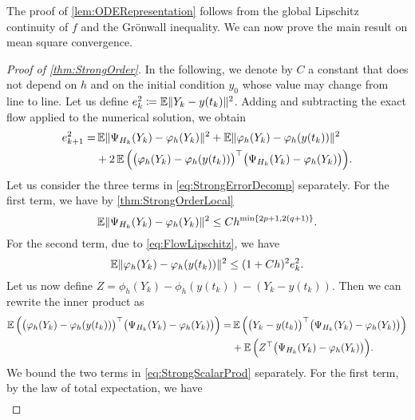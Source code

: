 \documentclass[10pt]{article}
\begin{document}
The proof of \cref{lem:ODERepresentation} follows from the global Lipschitz continuity of $f$ and the Grönwall inequality. We can now prove the main result on mean square convergence.
\begin{proof}[Proof of \cref{thm:StrongOrder}] In the following, we denote by $C$ a constant that does not depend on $h$ and on the initial condition $y_0$ whose value may change from line to line. Let us define $e_k^2 \coloneqq \operatorname{\mathbb{E}}\lVert Y_k - y(t_k)\rVert^2$. Adding and subtracting the exact flow applied to the numerical solution, we obtain
	\begin{equation}\label{eq:StrongErrorDecomp}
		\begin{aligned}
			e_{k+1}^2 = &\operatorname{\mathbb{E}}\lVert\Psi_{H_k}(Y_k) - \varphi_{h}(Y_k)\rVert^2 + \operatorname{\mathbb{E}}\lVert\varphi_{h}(Y_k) - \varphi_{h}(y(t_k))\rVert^2 \\
					  &+ 2\operatorname{\mathbb{E}}\Big(\big(\varphi_{h}(Y_k) - \varphi_{h}(y(t_k))\big)^\top \big(\Psi_{H_k}(Y_k) - \varphi_{h}(Y_k)\big)\Big).
		\end{aligned}
	\end{equation}
	Let us consider the three terms in \eqref{eq:StrongErrorDecomp} separately. For the first term, we have by \cref{thm:StrongOrderLocal}
	\begin{equation}\label{eq:StrongFirstTerm}
		\operatorname{\mathbb{E}}\lVert\Psi_{H_k}(Y_k) - \varphi_{h}(Y_k)\rVert^2 \leq Ch^{\min\{2p+1, 2(q+1)\}}.
	\end{equation}
    For the second term, due to \eqref{eq:FlowLipschitz}, we have
	\begin{equation}\label{eq:StrongSecondTerm}
		\operatorname{\mathbb{E}}\lVert\varphi_{h}(Y_k) - \varphi_{h}(y(t_k))\rVert^2 \leq (1 + Ch)^2 e_k^2.
	\end{equation}
	Let us now define $Z = \phi_{h}(Y_k) - \phi_{h}(y(t_k)) - (Y_k - y(t_k))$. Then we can rewrite the inner product as
	\begin{equation}\label{eq:StrongScalarProd}
	\begin{aligned}
		\operatorname{\mathbb{E}}\Big(\big(\varphi_{h}(Y_k) - \varphi_{h}(y(t_k))\big)^\top \big(\Psi_{H_k}(Y_k) - \varphi_{h}(Y_k)\big)\Big) = &\operatorname{\mathbb{E}}\Big(\big(Y_k - y(t_k)\big)^\top \big(\Psi_{H_k}(Y_k) - \varphi_{h}(Y_k)\big)\Big) \\
		&+ \operatorname{\mathbb{E}}\Big(Z^\top \big(\Psi_{H_k}(Y_k) - \varphi_{h}(Y_k)\big)\Big).
	\end{aligned}
	\end{equation}
	We bound the two terms in \eqref{eq:StrongScalarProd} separately. For the first term, by the law of total expectation, we have
	\begin{equation}
	\begin{aligned}

\end{aligned}
\end{equation}
\end{proof}
\end{document}
